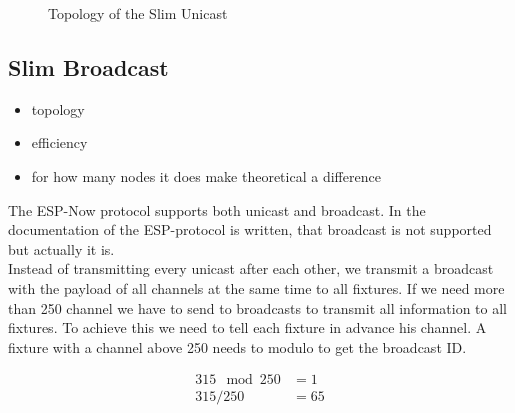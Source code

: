 \documentclass[]{ccs-thesis}
\begin{document}
\newcommand{\inputnum}{1} 
\newcommand{\outputnum}{3}  

\begin{figure}%
	\centering
	\caption{Topology of the Slim Unicast}%
	\label{fig:topology-unicast}%
\end{figure}

\subsection*{Slim Broadcast}
\begin{itemize}
\item topology
\item efficiency
\item for how many nodes it does make theoretical a difference
\end{itemize}

The ESP-Now protocol supports both unicast and broadcast.
In the documentation of the ESP-protocol is written, that broadcast is not supported 
but actually it is. \\
Instead of transmitting every unicast after each other, we transmit a broadcast with the payload of all channels at the same time to all fixtures.
If we need more than 250 channel we have to send to broadcasts to transmit all information to all fixtures.
To achieve this we need to tell each fixture in advance his channel.
A fixture with a channel above 250 needs to modulo to get the broadcast ID.

\begin{align*}
	315 \mod 250 &= 1 \\
	315 / 250 &= 65
\end{align*}
\end{document}
